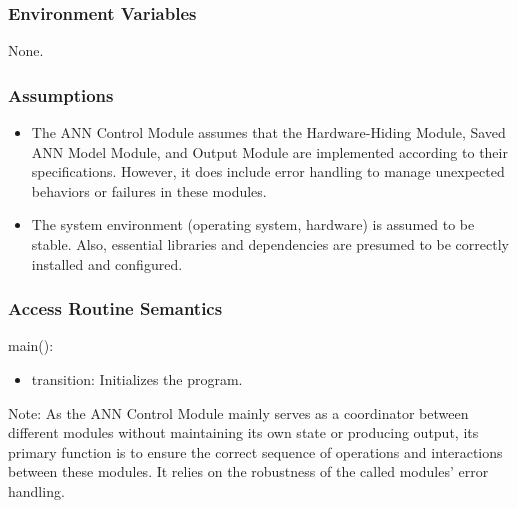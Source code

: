 \documentclass[12pt, titlepage]{article}
\begin{document}
\subsubsection{Environment Variables}
None.


\subsubsection{Assumptions}
\begin{itemize}
  \item The ANN Control Module assumes that the Hardware-Hiding Module, Saved ANN Model Module, and Output Module are implemented 
  according to their specifications. However, it does include error handling to manage unexpected behaviors or failures in these modules.
  \item The system environment (operating system, hardware) is assumed to be stable. 
  Also, essential libraries and dependencies are presumed to be correctly installed and configured.
\end{itemize}



\subsubsection{Access Routine Semantics}

\noindent main():
\begin{itemize}
  \item transition: Initializes the program.
\end{itemize}

Note: As the ANN Control Module mainly serves as a coordinator between different modules 
without maintaining its own state or producing output, its primary function is to ensure 
the correct sequence of operations and interactions between these modules. It relies on 
the robustness of the called modules' error handling.


\end{document}
